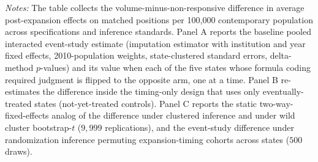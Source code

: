 \begin{table}[H]
\centering
\singlespacing
\small
\begin{threeparttable}
\caption{The Cross-Arm Difference: Estimates, Sensitivity, and Inference}
\label{atab:mechdiff}

\begin{tablenotes}\footnotesize
\item \textit{Notes:} The table collects the volume-minus-non-responsive difference in average post-expansion effects on matched positions per 100{,}000 contemporary population across specifications and inference standards. Panel A reports the baseline pooled interacted event-study estimate (imputation estimator with institution and year fixed effects, 2010-population weights, state-clustered standard errors, delta-method $p$-values) and its value when each of the five states whose formula coding required judgment is flipped to the opposite arm, one at a time. Panel B re-estimates the difference inside the timing-only design that uses only eventually-treated states (not-yet-treated controls). Panel C reports the static two-way-fixed-effects analog of the difference under clustered inference and under wild cluster bootstrap-$t$ ($9{,}999$ replications), and the event-study difference under randomization inference permuting expansion-timing cohorts across states ($500$ draws).
\end{tablenotes}
\end{threeparttable}
\end{table}
